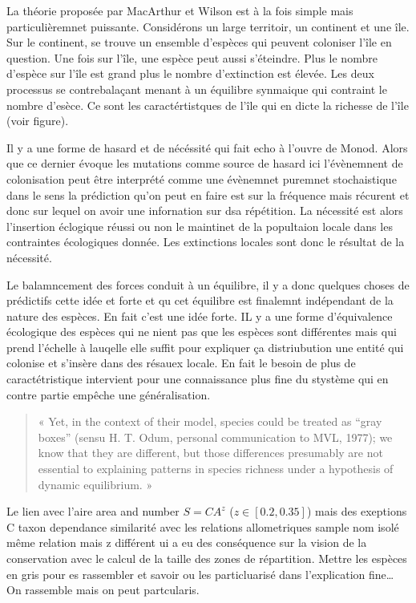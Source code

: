 La théorie proposée par MacArthur et Wilson est à la fois simple mais
particulièremnet puissante. Considérons un large territoir, un continent
et une île. Sur le continent, se trouve un ensemble d'espèces qui
peuvent coloniser l'île en question. Une fois sur l'île, une espèce peut
aussi s'éteindre. Plus le nombre d'espèce sur l'île est grand plus le
nombre d'extinction est élevée. Les deux processus se contrebalaçant
menant à un équilibre synmaique qui contraint le nombre d'esèce. Ce sont
les caractértistques de l'île qui en dicte la richesse de l'île (voir
figure).

Il y a une forme de hasard et de nécéssité qui fait echo à l'ouvre de
Monod. Alors que ce dernier évoque les mutations comme source de hasard
ici l'évènemnent de colonisation peut être interprété comme une
évènemnet puremnet stochaistique dans le sens la prédiction qu'on peut
en faire est sur la fréquence mais récurent et donc sur lequel on avoir
une infornation sur dsa répétition. La nécessité est alors l'insertion
éclogique réussi ou non le maintinet de la popultaion locale dans les
contraintes écologiques donnée. Les extinctions locales sont donc le
résultat de la nécessité.

Le balamncement des forces conduit à un équilibre, il y a donc quelques
choses de prédictifs cette idée et forte et qu cet équilibre est
finalemnt indépendant de la nature des espèces. En fait c'est une idée
forte. IL y a une forme d'équivalence écologique des espèces qui ne
nient pas que les espèces sont différentes mais qui prend l'échelle à
lauqelle elle suffit pour expliquer ça distriubution une entité qui
colonise et s'insère dans des résauex locale. En fait le besoin de plus
de caractétristique intervient pour une connaissance plus fine du
stystème qui en contre partie empêche une généralisation.

\begin{quote}
« Yet, in the context of their model, species could be treated as ``gray
boxes'' (sensu H. T. Odum, personal communication to MVL, 1977); we know
that they are different, but those differences presumably are not
essential to explaining patterns in species richness under a hypothesis
of dynamic equilibrium. »
\end{quote}

Le lien avec l'aire area and number \(S=CA^z\) (\(z \in [0.2,0.35]\))
mais des exeptions C taxon dependance similarité avec les relations
allometriques sample nom isolé même relation mais z différent ui a eu
des conséquence sur la vision de la conservation avec le calcul de la
taille des zones de répartition. Mettre les espèces en gris pour es
rassembler et savoir ou les particluarisé dans l'explication
fine\ldots{} On rassemble mais on peut partcularis.

